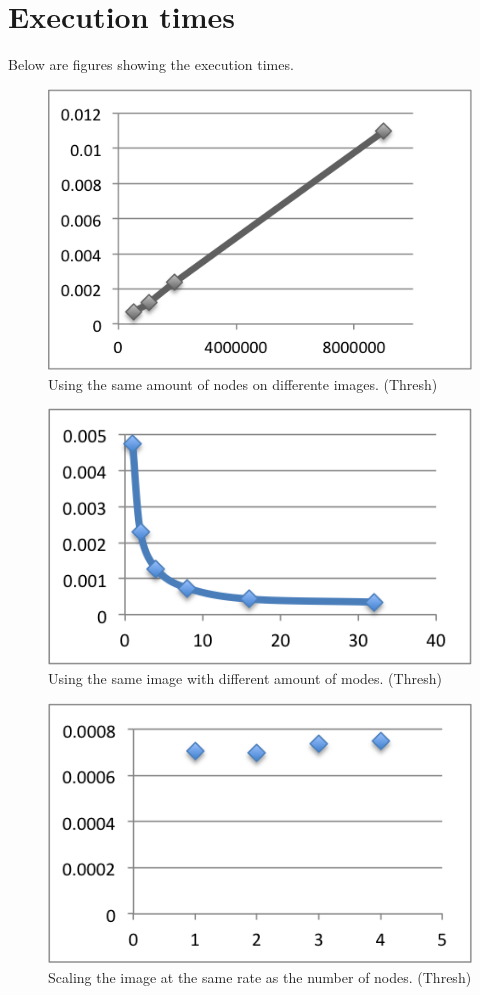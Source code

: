 \documentclass[a4paper]{article}
\begin{document}
\section{Execution times}
Below are figures showing the execution times.
\begin{figure}
  \centering
  \includegraphics{processor.png}
  \caption{Using the same amount of nodes on differente images. (Thresh)}
  \label{tab:fig1}
\end{figure}
  
\begin{figure}
  \centering
  \includegraphics{image.png}
  \caption{Using the same image with different amount of modes. (Thresh)}
  \label{tab:fig2}
\end{figure}

\begin{figure}
  \centering
  \includegraphics{scale.png}
  \caption{Scaling the image at the same rate as the number of nodes. (Thresh)}
  \label{tab:fig3}
\end{figure}
\end{document}
